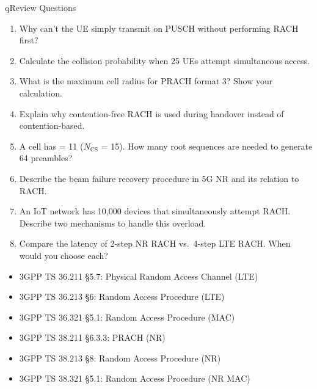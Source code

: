 \begin{CNbox}[unbreakable]{q}{Review Questions}

\begin{enumerate}
\def\labelenumi{\arabic{enumi}.}
\tightlist
\item
  Why can’t the UE simply transmit on PUSCH without performing RACH first?
\item
  Calculate the collision probability when 25 UEs attempt simultaneous access.
\item
  What is the maximum cell radius for PRACH format 3? Show your calculation.
\item
  Explain why contention-free RACH is used during handover instead of contention-based.
\item
  A cell has  = 11 (\ensuremath{N_{\mathrm{CS}}} = 15). How many root sequences are needed to generate 64 preambles?
\item
  Describe the beam failure recovery procedure in 5G NR and its relation to RACH.
\item
  An IoT network has 10,000 devices that simultaneously attempt RACH. Describe two mechanisms to handle this overload.
\item
  Compare the latency of 2-step NR RACH vs. 4-step LTE RACH. When would you choose each?
\end{enumerate}

\end{CNbox}


\begin{itemize}
\tightlist
\item
  3GPP TS 36.211 §5.7: Physical Random Access Channel (LTE)
\item
  3GPP TS 36.213 §6: Random Access Procedure (LTE)
\item
  3GPP TS 36.321 §5.1: Random Access Procedure (MAC)
\item
  3GPP TS 38.211 §6.3.3: PRACH (NR)
\item
  3GPP TS 38.213 §8: Random Access Procedure (NR)
\item
  3GPP TS 38.321 §5.1: Random Access Procedure (NR MAC)
\end{itemize}
